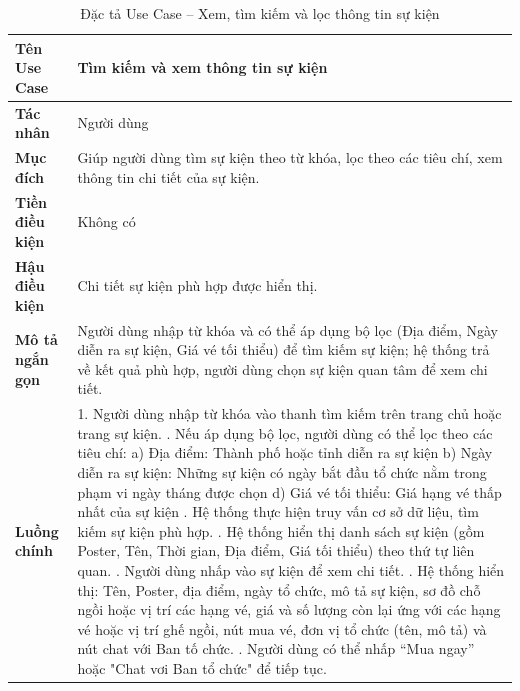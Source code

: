 \begin{longtable}{|p{}|p{}|}
\caption{Đặc tả Use Case -- Xem, tìm kiếm và lọc thông tin sự kiện}
\label{tab:uc_search_event} \\
\hline
\textbf{Tên Use Case} & Tìm kiếm và xem thông tin sự kiện \\ \hline
\textbf{Tác nhân} & Người dùng \\ \hline
\textbf{Mục đích} & Giúp người dùng tìm sự kiện theo từ khóa, lọc theo các tiêu chí, xem thông tin chi tiết của sự kiện. \\ \hline
\textbf{Tiền điều kiện} & Không có \\ \hline
\textbf{Hậu điều kiện} & Chi tiết sự kiện phù hợp được hiển thị. \\ \hline
\textbf{Mô tả ngắn gọn} & Người dùng nhập từ khóa và có thể áp dụng bộ lọc (Địa điểm, Ngày diễn ra sự kiện, Giá vé tối thiểu) để tìm kiếm sự kiện; hệ thống trả về kết quả phù hợp, người dùng chọn sự kiện quan tâm để xem chi tiết. \\ \hline
\textbf{Luồng chính} &
1. Người dùng nhập từ khóa vào thanh tìm kiếm trên trang chủ hoặc trang sự kiện. \newline
2. Nếu áp dụng bộ lọc, người dùng có thể lọc theo các tiêu chí: \newline
\hspace*{1em}a) Địa điểm: Thành phố hoặc tỉnh diễn ra sự kiện \newline
\hspace*{1em}b) Ngày diễn ra sự kiện: Những sự kiện có ngày bắt đầu tổ chức nằm trong phạm vi ngày tháng được chọn \newline
\hspace*{1em}d) Giá vé tối thiểu: Giá hạng vé thấp nhất của sự kiện \newline
3. Hệ thống thực hiện truy vấn cơ sở dữ liệu, tìm kiếm sự kiện phù hợp. \newline
4. Hệ thống hiển thị danh sách sự kiện (gồm Poster, Tên, Thời gian, Địa điểm, Giá tối thiểu) theo thứ tự liên quan. \newline
5. Người dùng nhấp vào sự kiện để xem chi tiết. \newline
6. Hệ thống hiển thị: Tên, Poster, địa điểm, ngày tổ chức, mô tả sự kiện, sơ đồ chỗ ngồi hoặc vị trí các hạng vé, giá và số lượng còn lại ứng với các hạng vé hoặc vị trí ghế ngồi, nút mua vé, đơn vị tổ chức (tên, mô tả) và nút chat với Ban tố chức. \newline
7. Người dùng có thể nhấp “Mua ngay” hoặc "Chat vơi Ban tổ chức" để tiếp tục. \\ \hline

\end{longtable}

